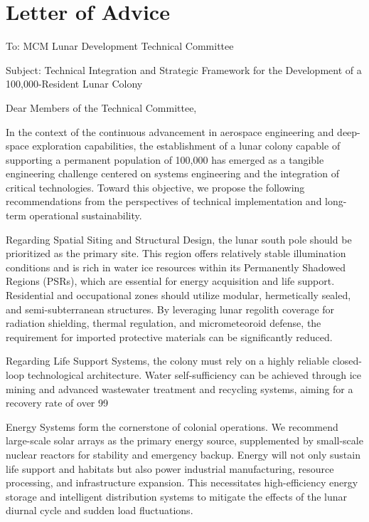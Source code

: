 \section{Letter of Advice}


{
\noindent To: MCM Lunar Development Technical Committee

Subject: Technical Integration and Strategic Framework for the Development of a 100,000-Resident Lunar Colony

Dear Members of the Technical Committee,

In the context of the continuous advancement in aerospace engineering and deep-space exploration capabilities, the establishment of a lunar colony capable of supporting a permanent population of 100,000 has emerged as a tangible engineering challenge centered on systems engineering and the integration of critical technologies. Toward this objective, we propose the following recommendations from the perspectives of technical implementation and long-term operational sustainability.

Regarding Spatial Siting and Structural Design, the lunar south pole should be prioritized as the primary site. This region offers relatively stable illumination conditions and is rich in water ice resources within its Permanently Shadowed Regions (PSRs), which are essential for energy acquisition and life support. Residential and occupational zones should utilize modular, hermetically sealed, and semi-subterranean structures. By leveraging lunar regolith coverage for radiation shielding, thermal regulation, and micrometeoroid defense, the requirement for imported protective materials can be significantly reduced.

Regarding Life Support Systems, the colony must rely on a highly reliable closed-loop technological architecture. Water self-sufficiency can be achieved through ice mining and advanced wastewater treatment and recycling systems, aiming for a recovery rate of over 99%

Energy Systems form the cornerstone of colonial operations. We recommend large-scale solar arrays as the primary energy source, supplemented by small-scale nuclear reactors for stability and emergency backup. Energy will not only sustain life support and habitats but also power industrial manufacturing, resource processing, and infrastructure expansion. This necessitates high-efficiency energy storage and intelligent distribution systems to mitigate the effects of the lunar diurnal cycle and sudden load fluctuations.

}
